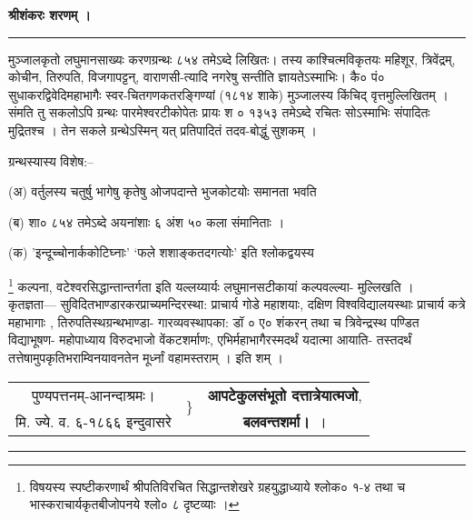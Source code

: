 \documentclass[11pt, openany]{book}
\begin{document}
\newpage
\thispagestyle{empty}
\begin{center}
\large{\textbf{श्रीशंकरः शरणम् ।}}\\
    \rule{0.3\linewidth}{1.0pt}
\end{center}
 
\justifying
 मुञ्जालकृतो लघुमानसाख्यः करणग्रन्थः ८५४ तमेऽब्दे लिखितः। तस्य
काश्चित्मविकृतयः महिशूर, त्रिवेंद्रम्, कोचीन, तिरुपति, विजगापट्टन्,
वाराणसी-त्यादि नगरेषु सन्तीति ज्ञायतेऽस्माभिः। कै० पं० सुधाकरद्विवेदिमहाभागैः
स्वर-चितगणकतरङ्गिण्यां (१८१४ शाके) मुञ्जालस्य किंचिद् वृत्तमुल्लिखितम् ।
संमति तु सकलोऽपि ग्रन्थः पारमेश्वरटीकोपेतः प्रायः श ० १३५३ तमेऽब्दे रचितः
सोऽस्माभिः संपादितः मुद्रितश्च । तेन सकले ग्रन्थेऽस्मिन् यत्
प्रतिपादितं तदव-बोद्धुं सुशकम् ।  

\justifying
ग्रन्थस्यास्य विशेष:-- 

(अ) वर्तुलस्य चतुर्षु भागेषु कृतेषु ओजपदान्ते भुजकोटयोः समानता भवति 

(ब) शा० ८५४ तमेऽब्दे अयनांशाः ६ अंश ५० कला संमानिताः ।

(क) 'इन्दूच्चोनार्ककोटिघ्नाः' `फले शशाङ्कतदगत्योः' इति श्लोकद्वयस्य

\noindent
\justifying\renewcommand{\thefootnote}{*}\footnote{ विषयस्य स्पष्टीकरणार्थं श्रीपतिविरचित सिद्धान्तशेखरे
ग्रहयुद्धाध्याये
श्लोक० १-४ तथा च भास्कराचार्यकृतबीजोपनये श्लो०  ८ दृष्टव्याः ।} कल्पना, वटेश्वरसिद्धान्तान्तर्गता इति यल्लय्यार्यः लघुमानसटीकायां
कल्पवल्ल्या-
मुल्लिखति ।\\

\justifying
 कृतज्ञता--- सुविदितभाण्डारकरप्राच्यमन्दिरस्था: प्राचार्य गोडे
महाशयाः,
दक्षिण विश्वविद्यालयस्थाः प्राचार्य कत्रे महाभागाः ,
तिरुपतिस्थग्रन्थभाण्डा-
गारव्यवस्थापका: डॉ ० ए० शंकरन् तथा च त्रिवेन्द्रस्थ पण्डित
विद्याभूषण-
महोपाध्याय विरुदभाजो वेंकटशर्माणः, एभिर्महाभागैरस्मदर्थं यदात्मा
आयाति-
तस्तदर्थं तत्तेषामुपकृतिभराम्विनयावनतेन मूर्ध्नां वहामस्तराम् । इति
शम् ।\\

\vspace{3mm} 
\begin{table}[h!]
    \begin{tabular}{ccc}
     पुण्यपत्तनम्-आनन्दाश्रमः।     &\multirow{2}{*}{$\Bigg\}$}& \textbf{ आपटेकुलसंभूतो दत्तात्रेयात्मजो}, \\
      मि. ज्ये. व. ६-१८६६  इन्दुवासरे &   & \textbf{ बलवन्तशर्मा।}~।\\
    \end{tabular}
\end{table}
\centering
\rule{0.2\linewidth}{1.0pt}
\end{document}
